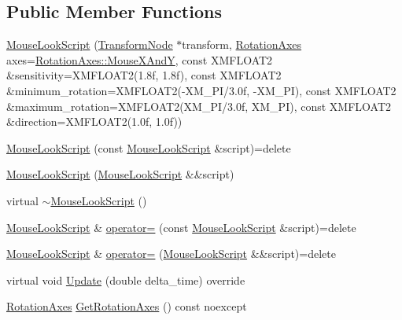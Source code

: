 \subsection*{Public Member Functions}
\begin{DoxyCompactItemize}
\item 
\hyperlink{classmage_1_1_mouse_look_script_a6f2e447da00bbea7cf146b4d2aef3a57}{Mouse\+Look\+Script} (\hyperlink{structmage_1_1_transform_node}{Transform\+Node} $\ast$transform, \hyperlink{classmage_1_1_mouse_look_script_af63fd955f796c11e0378813e5d1ab5f8}{Rotation\+Axes} axes=\hyperlink{classmage_1_1_mouse_look_script_af63fd955f796c11e0378813e5d1ab5f8a109431b32c091e8a7ad541546c66c522}{Rotation\+Axes\+::\+Mouse\+X\+AndY}, const X\+M\+F\+L\+O\+A\+T2 \&sensitivity=X\+M\+F\+L\+O\+A\+T2(1.\+8f, 1.\+8f), const X\+M\+F\+L\+O\+A\+T2 \&minimum\+\_\+rotation=\+X\+M\+F\+L\+O\+A\+T2(-\/\+X\+M\+\_\+\+P\+I/3.\+0f, -\/\+X\+M\+\_\+\+P\+I), const X\+M\+F\+L\+O\+A\+T2 \&maximum\+\_\+rotation=\+X\+M\+F\+L\+O\+A\+T2(\+X\+M\+\_\+\+P\+I/3.\+0f, X\+M\+\_\+\+P\+I), const X\+M\+F\+L\+O\+A\+T2 \&direction=\+X\+M\+F\+L\+O\+A\+T2(1.\+0f, 1.\+0f))
\item 
\hyperlink{classmage_1_1_mouse_look_script_a54bd09419068ab61c4dd6fda412771d3}{Mouse\+Look\+Script} (const \hyperlink{classmage_1_1_mouse_look_script}{Mouse\+Look\+Script} \&script)=delete
\item 
\hyperlink{classmage_1_1_mouse_look_script_aaca52076bde601772344c61639345e03}{Mouse\+Look\+Script} (\hyperlink{classmage_1_1_mouse_look_script}{Mouse\+Look\+Script} \&\&script)
\item 
virtual \hyperlink{classmage_1_1_mouse_look_script_ac402a33218e69d3594102b606dd051dc}{$\sim$\+Mouse\+Look\+Script} ()
\item 
\hyperlink{classmage_1_1_mouse_look_script}{Mouse\+Look\+Script} \& \hyperlink{classmage_1_1_mouse_look_script_a13fba7e90bf10d24814e0a8cec25645e}{operator=} (const \hyperlink{classmage_1_1_mouse_look_script}{Mouse\+Look\+Script} \&script)=delete
\item 
\hyperlink{classmage_1_1_mouse_look_script}{Mouse\+Look\+Script} \& \hyperlink{classmage_1_1_mouse_look_script_a2754174f5595fa424471c631818dc2b6}{operator=} (\hyperlink{classmage_1_1_mouse_look_script}{Mouse\+Look\+Script} \&\&script)=delete
\item 
virtual void \hyperlink{classmage_1_1_mouse_look_script_a7962403a78c02b2fe64e8f06f6319312}{Update} (double delta\+\_\+time) override
\item 
\hyperlink{classmage_1_1_mouse_look_script_af63fd955f796c11e0378813e5d1ab5f8}{Rotation\+Axes} \hyperlink{classmage_1_1_mouse_look_script_afe564764c233eab0f1183e4d4096c037}{Get\+Rotation\+Axes} () const noexcept

\end{DoxyCompactItemize}
